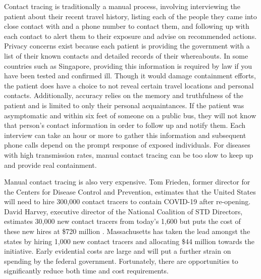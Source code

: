 \documentclass{article}
\begin{document}
Contact tracing is traditionally a manual process, involving interviewing the patient about their recent travel history, listing each of the people they came into close contact with and a phone number to contact them, and following up with each contact to alert them to their exposure and advise on recommended actions. Privacy concerns exist because each patient is providing the government with a list of their known contacts and detailed records of their whereabouts. In some countries such as Singapore, providing this information is required by law if you have been tested and confirmed ill. Though it would damage containment efforts, the patient does have a choice to not reveal certain travel locations and personal contacts. Additionally, accuracy relies on the memory and truthfulness of the patient and is limited to only their personal acquaintances. If the patient was asymptomatic and within six feet of someone on a public bus, they will not know that person’s contact information in order to follow up and notify them. Each interview can take an hour or more to gather this information and subsequent phone calls depend on the prompt response of exposed individuals. For diseases with high transmission rates, manual contact tracing can be too slow to keep up and provide real containment.

Manual contact tracing is also very expensive. Tom Frieden, former director for the Centers for Disease Control and Prevention, estimates that the United States will need to hire 300,000 contact tracers to contain COVID-19 after re-opening. David Harvey, executive director of the National Coalition of STD Directors, estimates 30,000 new contact tracers from today’s 1,600 but puts the cost of these new hires at \$720 million \cite{ContactTracers_STAT}.  Massachusetts has taken the lead amongst the states by hiring 1,000 new contact tracers and allocating \$44 million towards the initiative. Early evidential costs are large and will put a further strain on spending by the federal government. Fortunately, there are opportunities to significantly reduce both time and cost requirements.
\end{document}

